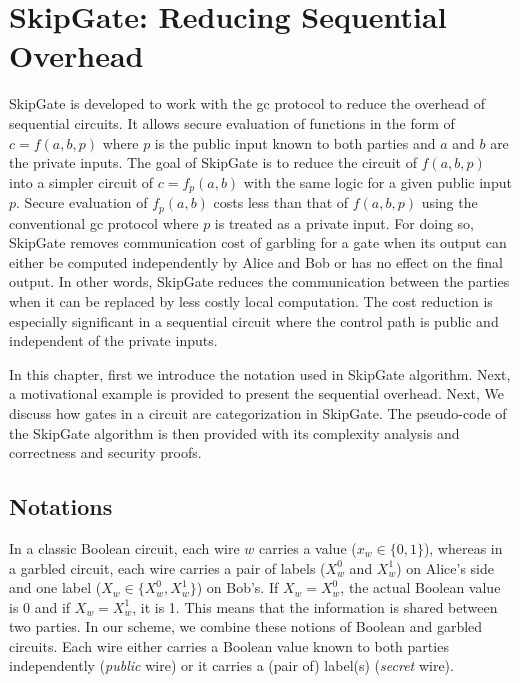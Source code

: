 \chapter{{SkipGate}: Reducing Sequential Overhead}\label{chap:skipgate}
SkipGate is developed to work with the \acrshort{gc} protocol to reduce the overhead of sequential circuits.
It allows secure evaluation of functions in the form of $c = f(a, b, p)$ where $p$ is the public input known to both parties and $a$ and $b$ are the private inputs.
The goal of SkipGate is to reduce the circuit of $f(a, b, p)$ into a simpler circuit of $c = f_p(a,b)$ with the same logic for a given public input $p$.
Secure evaluation of $f_p(a,b)$ costs less than that of $f(a, b, p)$ using the conventional \acrshort{gc} protocol where $p$ is treated as a private input.
For doing so, SkipGate removes communication cost of garbling for a gate when its output can either be computed independently by Alice and Bob or has no effect on the final output.
In other words, SkipGate reduces the communication between the parties when it can be replaced by less costly local computation.
The cost reduction is especially significant in a sequential circuit where the control path is public and independent of the private inputs.

In this chapter, first we introduce the notation used in SkipGate algorithm.
Next, a motivational example is provided to present the sequential overhead.
Next, We discuss how gates in a circuit are categorization in SkipGate.
The pseudo-code of the SkipGate algorithm is then provided with its complexity analysis and correctness and security proofs.

\section{Notations}\label{sec:skipgate-notation}
In a classic Boolean circuit, each wire $w$ carries a value ($x_w\in\{0, 1\}$), whereas in a garbled circuit, each wire carries a pair of labels ($X_w^{0}$ and $X_w^{1}$) on Alice's side and one label ($X_w \in \{X_w^{0}, X_w^{1}\}$) on Bob's.
If $X_w = X_w^{0}$, the actual Boolean value is 0 and if $X_w = X_w^{1}$, it is 1.
This means that the information is shared between two parties.
In our scheme, we combine these notions of Boolean and garbled circuits.
Each wire either carries a Boolean value known to both parties independently (\textit{public} wire) or it carries a (pair of) label(s) (\textit{secret} wire).

